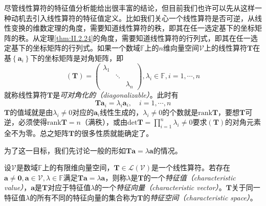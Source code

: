 \documentclass[main.tex]{subfiles}
\begin{document}
尽管线性算符的特征值分析能给出很丰富的结论，但目前我们也许可以先从这样一种动机去引入线性算符的特征值定义。比如我们关心一个线性算符是否可逆，从线性变换的维数定理的角度，需要知道线性算符的秩，即其在任一选定基下的坐标矩阵的秩。从定理\ref{thm:II.2.24}的角度，需要知道线性算符的行列式，即其在任一选定基下的坐标矩阵的行列式。如果一个数域$\mathbb{F}$上的$n$维向量空间$\mathcal{V}$上的线性算符$\mathbf{T}$在基$\left\{\mathbf{a}_i\right\}$下的坐标矩阵是对角矩阵，即
\[\left(\mathbf{T}\right)=\left(\begin{array}{ccc}\lambda_1&&\\&\ddots&\\&&\lambda_n\end{array}\right),\lambda_i\in\mathbb{F},i=1,\cdots,n\]
就称线性算符$\mathbf{T}$是\emph{可对角化的（diagonalizable）}。此时有
\[\mathbf{Ta}_i=\lambda_i \mathbf{a}_i,\quad i=1,\cdots,n\]
$\mathbf{T}$的值域就是由$\lambda_i\neq 0$对应的$\mathbf{a}_i$线性生成的，$\lambda_i\neq 0$的个数就是$\mathrm{rank}\mathbf{T}$，要想$\mathbf{T}$可逆，必须使得$\mathrm{rank}\mathbf{T}=n$（满秩），或由$\mathrm{det}\mathbf{T}=\prod_{i=1}^n\lambda_i\neq 0$要求$\left(\mathbf{T}\right)$的对角元素全不为零。总之矩阵$\mathbf{T}$的很多性质就能确定了。

为了这一目标，我们先讨论一般的形如$\mathbf{Ta}=\lambda\mathbf{a}$的情况。

\begin{definition}\label{def:II.2.21}
    设$\mathcal{V}$是数域$\mathbb{F}$上的有限维向量空间，$\mathbf{T}\in\mathcal{L}\left(\mathcal{V}\right)$是一个线性算符。若存在$\mathbf{a}\neq\mathbf{0},\mathbf{a}\in\mathcal{V},\lambda\in\mathbb{F}$满足$\mathbf{Ta}=\lambda\mathbf{a}$，则称$\lambda$是$\mathbf{T}$的一个\emph{特征值（characteristic value）}，$\mathbf{a}$是$\mathbf{T}$对应于特征值$\lambda$的一个\emph{特征向量（characteristic vector）}。$\mathbf{T}$关于同一特征值$\lambda$的所有不同的特征向量的集合称为$\mathbf{T}$的\emph{特征空间（characteristic space）}。
\end{definition}
\end{document}
